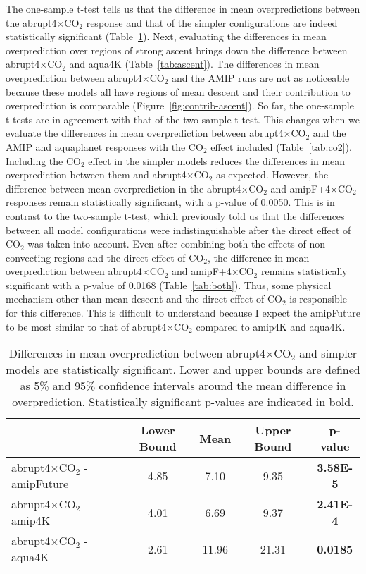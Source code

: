 \documentclass{article}
\begin{document}
The one-sample t-test tells us that the difference in mean overpredictions between the abrupt4$\times$CO$_2$ response and that of the simpler configurations are indeed statistically significant (Table~\ref{tab:vanilla}). Next, evaluating the differences in mean overprediction over regions of strong ascent brings down the difference between abrupt4$\times$CO$_2$ and aqua4K (Table~\ref{tab:ascent}). The differences in mean overprediction between abrupt4$\times$CO$_2$ and the AMIP runs are not as noticeable because these models all have regions of mean descent and their contribution to overprediction is comparable (Figure~\ref{fig:contrib-ascent}). So far, the one-sample t-tests are in agreement with that of the two-sample t-test. This changes when we evaluate the differences in mean overprediction between abrupt4$\times$CO$_2$ and the AMIP and aquaplanet responses with the CO$_2$ effect included (Table~\ref{tab:co2}). Including the CO$_2$ effect in the simpler models reduces the differences in mean overprediction between them and abrupt4$\times$CO$_2$ as expected. However, the difference between mean overprediction in the abrupt4$\times$CO$_2$ and amipF+4$\times$CO$_2$ responses remain statistically significant, with a p-value of 0.0050. This is in contrast to the two-sample t-test, which previously told us that the differences between all model configurations were indistinguishable after the direct effect of CO$_2$ was taken into account. Even after combining both the effects of non-convecting regions and the direct effect of CO$_2$, the difference in mean overprediction between abrupt4$\times$CO$_2$ and amipF+4$\times$CO$_2$ remains statistically significant with a p-value of 0.0168 (Table~\ref{tab:both}). Thus, some physical mechanism other than mean descent and the direct effect of CO$_2$ is responsible for this difference. This is difficult to understand because I expect the amipFuture to be most similar to that of abrupt4$\times$CO$_2$ compared to amip4K and aqua4K.

\begin{table}
\caption{Differences in mean overprediction between abrupt4$\times$CO$_2$ and simpler models are statistically significant. Lower and upper bounds are defined as 5\% and 95\% confidence intervals around the mean difference in overprediction. Statistically significant p-values are indicated in bold.}
\begin{tabular}{l c c c c} \hline
& Lower Bound & Mean & Upper Bound & p-value \\ \hline
abrupt4$\times$CO$_2$ - amipFuture & 4.85 & 7.10 & 9.35 & \textbf{3.58E-5} \\
abrupt4$\times$CO$_2$ - amip4K & 4.01 & 6.69 & 9.37 & \textbf{2.41E-4} \\
abrupt4$\times$CO$_2$ - aqua4K & 2.61 & 11.96 & 21.31 & \textbf{0.0185} \\ \hline
\end{tabular}
\label{tab:vanilla}
\end{table}
\end{document}
